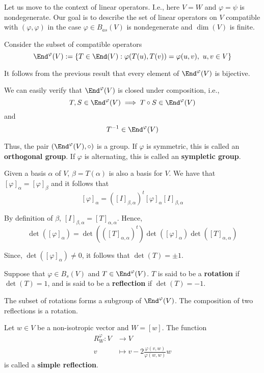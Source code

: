 Let us move to the context of linear operators. I.e., here $V = W$ and $\varphi = \psi$ is nondegenerate. Our goal is to describe the set of linear operators on $V$ compatible with $(\varphi, \varphi)$ in the case $\varphi \in B_{as}(V)$ is nondegenerate and $\dim(V)$ is finite. 

Consider the subset of compatible operators
\[
  \End^\varphi(V) := \{ T \in \End(V) : \varphi(T(u), T(v)) = \varphi(u, v), ~u,v \in V \}
\]

It follows from the previous result that every element of $\End^\varphi(V)$ is bijective.

We can easily verify that $\End^\varphi(V)$ is closed under composition, i.e., 
\[
  T, S \in \End^\varphi(V) \implies T \circ S \in \End^\varphi(V) 
\]
and 
\[
  T^{-1} \in \End^\varphi(V)
\]

Thus, the pair $(\End^\varphi(V), \circ)$ is a group. If $\varphi$ is symmetric, this is called an \textbf{orthogonal group}. If $\varphi$ is alternating, this is called an \textbf{sympletic group}.

Given a basis $\alpha$ of $V$, $\beta = T(\alpha)$ is also a basis for $V$. We have that $[\varphi]_\alpha = [\varphi]_\beta$ and it follows that 
\[
  [\varphi]_\alpha = ([I]_{\beta, \alpha})^t [\varphi]_\alpha [I]_{\beta, \alpha}
\]

By definition of $\beta$, $[I]_{\beta, \alpha} = [T]_{\alpha, \alpha}$. Hence, 
\[
  \det([\varphi]_\alpha) = \det(([T]_{\alpha, \alpha})^t) \det([\varphi]_\alpha) \det([T]_{\alpha, \alpha}) 
\]

Since, $\det([\varphi]_\alpha) \neq 0$, it follows that $\det(T) = \pm 1$. 

\begin{definition}
  Suppose that $\varphi \in B_s(V)$ and $T \in \End^\varphi(V)$. $T$ is said to be a \textbf{rotation} if $\det(T) = 1$, and is said to be a \textbf{reflection} if $\det(T) = -1$.
\end{definition}

The subset of rotations forms a subgroup of $\End^\varphi(V)$. The composition of two reflections is a rotation. 

\begin{definition}
  Let $w \in V$ be a non-isotropic vector and $W = [w]$. The function 
  \begin{equation*}
    \begin{aligned}
      R_W^\varphi : V &\longrightarrow V \\
      v &\longmapsto v - 2 \frac{\varphi(v,w)}{\varphi(w,w)} w
    \end{aligned}
  \end{equation*}
  is called a \textbf{simple reflection}.
\end{definition}

